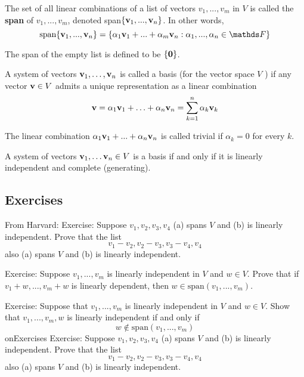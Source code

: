 \documentclass{article}
\begin{document}
\begin{definition}
The set of all linear combinations of a list of vectors
$v_{1},...,v_{m}$ in $V$ is called the \textbf{span} of $v_{1},...,v_{m}$,
denoted span$\{{\mathbf{v}}_{1},...,{\mathbf{v}}_{n}\}$. In other words, 
$$
\text{span}\{\bv_{1},...,\bv_{n}\}=\{\alpha_{1}\bv_{1}+...+\alpha_{m}\bv_{n} :\alpha_{1},...,\alpha_{n}\in\F\}
$$
\end{definition}
The span of the empty list is defined to be $\{{\mathbf{0}}\}$.

\begin{definition}
A system of vectors ${\mathbf{v}}_1, \ldots, {\mathbf{v}}_n$ is called a basis (for the vector space $V$ ) if any vector ${\mathbf{v}} \in V$ admits a unique representation as a linear combination
$$
{\mathbf{v}} = \alpha_1 {\mathbf{v}}_1 + \ldots + \alpha_n {\mathbf{v}}_n = \sum_{k=1}^n \alpha_k {\mathbf{v}}_k
$$
\end{definition}

\begin{definition}
The linear combination $\alpha_{1}{\mathbf{v}}_{1}+...+\alpha_{n}{\mathbf{v}}_{n}$ is called trivial if $\alpha_k = 0$ for every $k$.

\end{definition}

\begin{proposition}
 A system of vectors ${\mathbf{v}}_1, \ldots {\mathbf{v}}_n \in V$ is a basis if and only if it is linearly independent and complete (generating).
\end{proposition}


\subsection{Exercises}
From Harvard:
Exercise: Suppose $v_{1},v_{2},v_{3},v_{4}$ (a) spans $V$ and (b)
is linearly independent. Prove that the list 
\[
v_{1}-v_{2},v_{2}-v_{3},v_{3}-v_{4},v_{4}
\]
 also (a) spans $V$ and (b) is linearly independent. 

\vspace{7mm}

Exercise: Suppose $v_{1},...,v_{m}$ is linearly independent in $V$
and $w\in V$. Prove that if $v_{1}+w,...,v_{m}+w$ is linearly dependent,
then $w\in\text{span}(v_{1},...,v_{m})$. 

Exercise: Suppose that $v_{1},...,v_{m}$ is linearly independent
in $V$ and $w\in V$. Show that $v_{1},...,v_{m},w$ is linearly
independent if and only if 
\[
w\notin\text{span}(v_{1},...,v_{m})
\]
on{Exercises}
Exercise: Suppose $v_{1},v_{2},v_{3},v_{4}$ (a) spans $V$ and (b)
is linearly independent. Prove that the list 
\[
v_{1}-v_{2},v_{2}-v_{3},v_{3}-v_{4},v_{4}
\]
 also (a) spans $V$ and (b) is linearly independent. 
\end{document}
